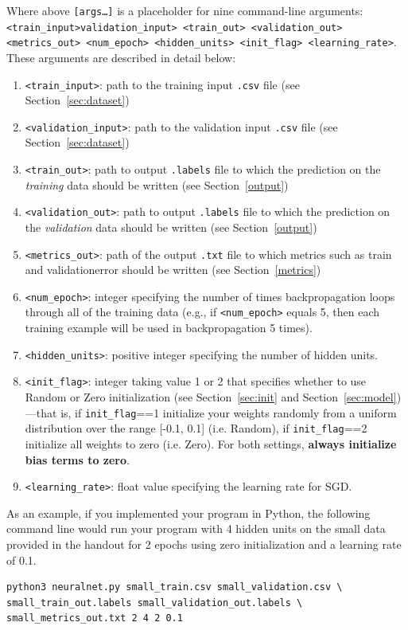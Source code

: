 \documentclass[11pt,addpoints,answers]{exam}
\begin{document}
Where above \texttt{[args\dots]} is a placeholder for nine command-line arguments: \texttt{<train\_input>}\newline \texttt{validation\_input> <train\_out> <validation\_out> <metrics\_out> <num\_epoch> \newline <hidden\_units>  <init\_flag> <learning\_rate>}. These arguments are described in detail below:
\begin{enumerate}
    \item \texttt{<train\_input>}: path to the training input \texttt{.csv} file (see Section~\ref{sec:dataset})
    \item \texttt{<validation\_input>}: path to the validation input \texttt{.csv} file (see Section~\ref{sec:dataset})
    \item \texttt{<train\_out>}: path to output \texttt{.labels} file to which the prediction on the \emph{training} data should be written (see Section~\ref{output})
    \item \texttt{<validation\_out>}: path to output \texttt{.labels} file to which the prediction on the \emph{validation} data should be written (see Section~\ref{output})
    \item \texttt{<metrics\_out>}: path of the output \texttt{.txt} file to which metrics such as train and validation\thinspace error should be written (see Section~\ref{metrics})
    \item \texttt{<num\_epoch>}: integer specifying the number of times backpropagation loops through all of the training data (e.g., if \texttt{<num\_epoch>} equals 5, then each training example will be used in backpropagation 5 times).
    \item \texttt{<hidden\_units>}: positive integer specifying the number of hidden units. 
    \item \texttt{<init\_flag>}: integer taking value 1 or 2 that specifies whether to use {\sc Random} or {\sc Zero} initialization (see Section~\ref{sec:init} and Section~\ref{sec:model})---that is, if \lstinline{init_flag}==1 initialize your weights randomly from a uniform distribution over the range [-0.1, 0.1] (i.e. {\sc Random}), if \lstinline{init_flag}==2 initialize all weights to zero (i.e. {\sc Zero}). For both settings, {\bf always initialize bias terms to zero}.
    \item \texttt{<learning\_rate>}: float value specifying the learning rate for SGD.

\end{enumerate}

As an example, if you implemented your program in Python, the following command line would run your program with 4 hidden units on the small data provided in the handout for 2 epochs using zero initialization and a learning rate of 0.1.
\\
\begin{lstlisting}[language=Shell]
python3 neuralnet.py small_train.csv small_validation.csv \
small_train_out.labels small_validation_out.labels \
small_metrics_out.txt 2 4 2 0.1 
\end{lstlisting}
\end{document}
